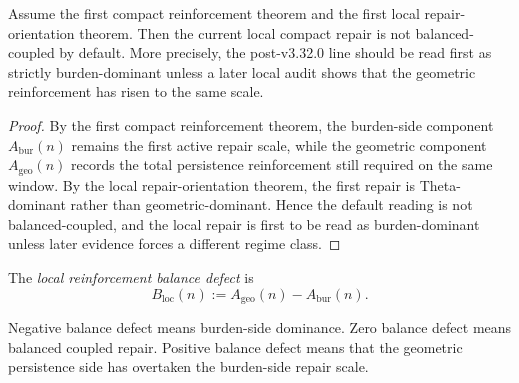 \begin{proposition}
\label{prop:current-compact-repair-is-not-balanced-by-default}
Assume the first compact reinforcement theorem and the first local repair-orientation theorem.
Then the current local compact repair is not balanced-coupled by default.
More precisely, the post-v3.32.0 line should be read first as strictly burden-dominant unless a later local audit shows that the geometric reinforcement has risen to the same scale.
\end{proposition}

\begin{proof}
By the first compact reinforcement theorem, the burden-side component $A_{\mathrm{bur}}(n)$ remains the first active repair scale, while the geometric component $A_{\mathrm{geo}}(n)$ records the total persistence reinforcement still required on the same window.
By the local repair-orientation theorem, the first repair is Theta-dominant rather than geometric-dominant.
Hence the default reading is not balanced-coupled, and the local repair is first to be read as burden-dominant unless later evidence forces a different regime class.
\end{proof}

\begin{definition}
\label{def:local-reinforcement-balance-defect}
The \emph{local reinforcement balance defect} is
\[
  B_{\mathrm{loc}}(n)
  :=
  A_{\mathrm{geo}}(n)-A_{\mathrm{bur}}(n).
\]
\end{definition}

\begin{remark}
\label{rem:interpretation-of-the-balance-defect}
Negative balance defect means burden-side dominance.
Zero balance defect means balanced coupled repair.
Positive balance defect means that the geometric persistence side has overtaken the burden-side repair scale.
\end{remark}

